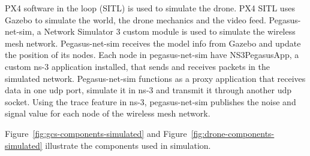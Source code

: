 PX4 software in the loop (SITL) is used to simulate the drone. PX4 SITL uses Gazebo to simulate the world, the drone mechanics and the video feed. Pegasus-net-sim, a Network Simulator 3 custom module is used to simulate the wireless mesh network. Pegasus-net-sim receives the model info from Gazebo and update the position of its nodes. Each node in pegasus-net-sim have NS3PegasusApp, a custom ns-3 application installed, that sends and receives packets in the simulated network. Pegasus-net-sim functions as a proxy application that receives data in one udp port, simulate it in ns-3 and transmit it through another udp socket. Using the trace feature in ns-3, pegasus-net-sim publishes the noise and signal value for each node of the wireless mesh network.

Figure~\ref{fig:gcs-components-simulated} and Figure~\ref{fig:drone-components-simulated} illustrate the components used in simulation. 

